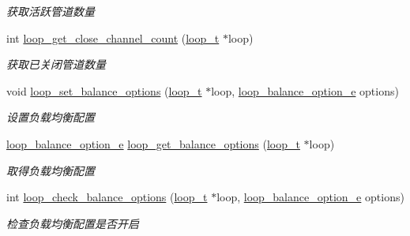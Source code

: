 \begin{DoxyCompactItemize}
\begin{DoxyCompactList}\small\item\em 获取活跃管道数量 \end{DoxyCompactList}\item 
int \hyperlink{a00105_ga604184ddcd3e06bc7bfd4f1722778029_ga604184ddcd3e06bc7bfd4f1722778029}{loop\+\_\+get\+\_\+close\+\_\+channel\+\_\+count} (\hyperlink{a00051_a9c3ad1cd2de83e09f3a7b59fa82c94ee_a9c3ad1cd2de83e09f3a7b59fa82c94ee}{loop\+\_\+t} $\ast$loop)
\begin{DoxyCompactList}\small\item\em 获取已关闭管道数量 \end{DoxyCompactList}\item 
void \hyperlink{a00069_a20964027b5a498c7f206d6a04568fa11_a20964027b5a498c7f206d6a04568fa11}{loop\+\_\+set\+\_\+balance\+\_\+options} (\hyperlink{a00051_a9c3ad1cd2de83e09f3a7b59fa82c94ee_a9c3ad1cd2de83e09f3a7b59fa82c94ee}{loop\+\_\+t} $\ast$loop, \hyperlink{a00051_a6c87150c8f33855c3427c783480fd8ba_a6c87150c8f33855c3427c783480fd8ba}{loop\+\_\+balance\+\_\+option\+\_\+e} options)
\begin{DoxyCompactList}\small\item\em 设置负载均衡配置 \end{DoxyCompactList}\item 
\hyperlink{a00051_a6c87150c8f33855c3427c783480fd8ba_a6c87150c8f33855c3427c783480fd8ba}{loop\+\_\+balance\+\_\+option\+\_\+e} \hyperlink{a00069_a5098c33527e18f4a0bd9bc1856ce17f1_a5098c33527e18f4a0bd9bc1856ce17f1}{loop\+\_\+get\+\_\+balance\+\_\+options} (\hyperlink{a00051_a9c3ad1cd2de83e09f3a7b59fa82c94ee_a9c3ad1cd2de83e09f3a7b59fa82c94ee}{loop\+\_\+t} $\ast$loop)
\begin{DoxyCompactList}\small\item\em 取得负载均衡配置 \end{DoxyCompactList}\item 
int \hyperlink{a00069_aff034d62b761d4ebad97180fb55a4582_aff034d62b761d4ebad97180fb55a4582}{loop\+\_\+check\+\_\+balance\+\_\+options} (\hyperlink{a00051_a9c3ad1cd2de83e09f3a7b59fa82c94ee_a9c3ad1cd2de83e09f3a7b59fa82c94ee}{loop\+\_\+t} $\ast$loop, \hyperlink{a00051_a6c87150c8f33855c3427c783480fd8ba_a6c87150c8f33855c3427c783480fd8ba}{loop\+\_\+balance\+\_\+option\+\_\+e} options)
\begin{DoxyCompactList}\small\item\em 检查负载均衡配置是否开启 \end{DoxyCompactList}\item 

\end{DoxyCompactItemize}
